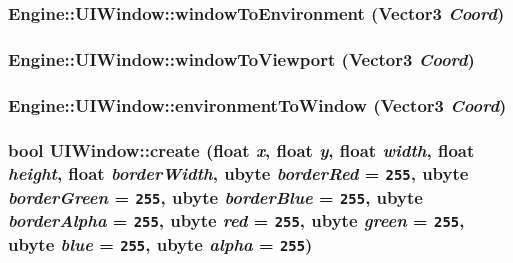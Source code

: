 \subsubsection{ Engine::UIWindow::windowToEnvironment ({\bf Vector3} {\em Coord})\hspace{0.3cm}{\tt  [protected]}}\label{classEngine_1_1UIWindow_1cfeca1ab84c313e3773255f61c799f8}


\subsubsection{ Engine::UIWindow::windowToViewport ({\bf Vector3} {\em Coord})\hspace{0.3cm}{\tt  [protected]}}\label{classEngine_1_1UIWindow_61081fb3de8795881813e9f40d21a6eb}


\subsubsection{ Engine::UIWindow::environmentToWindow ({\bf Vector3} {\em Coord})\hspace{0.3cm}{\tt  [protected]}}\label{classEngine_1_1UIWindow_dbb03ab6286b31fa443f0a3af36b270b}


\subsubsection{\setlength{\rightskip}{0pt plus 5cm}bool UIWindow::create (float {\em x}, float {\em y}, float {\em width}, float {\em height}, float {\em borderWidth}, {\bf ubyte} {\em borderRed} = {\tt 255}, {\bf ubyte} {\em borderGreen} = {\tt 255}, {\bf ubyte} {\em borderBlue} = {\tt 255}, {\bf ubyte} {\em borderAlpha} = {\tt 255}, {\bf ubyte} {\em red} = {\tt 255}, {\bf ubyte} {\em green} = {\tt 255}, {\bf ubyte} {\em blue} = {\tt 255}, {\bf ubyte} {\em alpha} = {\tt 255})}\label{classEngine_1_1UIWindow_db704f560a06bbd521069ef50b8824c0}


